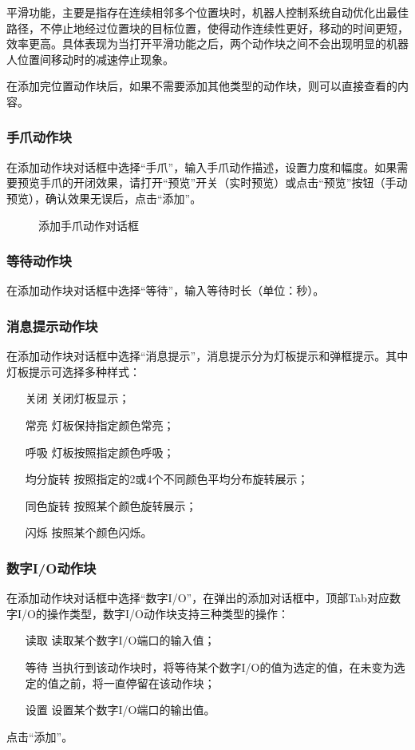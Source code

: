 平滑功能，主要是指存在连续相邻多个位置块时，机器人控制系统自动优化出最佳路径，不停止地经过位置块的目标位置，使得动作连续性更好，移动的时间更短，效率更高。具体表现为当打开平滑功能之后，两个动作块之间不会出现明显的机器人位置间移动时的减速停止现象。

在添加完位置动作块后，如果不需要添加其他类型的动作块，则可以直接查看的内容。

\subsubsection{手爪动作块}
在添加动作块对话框中选择“手爪”，输入手爪动作描述，设置力度和幅度。如果需要预览手爪的开闭效果，请打开“预览”开关（实时预览）或点击“预览”按钮（手动预览），确认效果无误后，点击“添加”。

\begin{figure}[ht]
	\centering
	\color{red}{缺图}
	\caption{添加手爪动作对话框}
	\label{fig:添加手爪动作对话框}
\end{figure}

\subsubsection{等待动作块}
在添加动作块对话框中选择“等待”，输入等待时长（单位：秒）。
\subsubsection{消息提示动作块}
在添加动作块对话框中选择“消息提示”，消息提示分为灯板提示和弹框提示。其中灯板提示可选择多种样式：
\begin{itemize}[font=\bfseries]
\item[关闭] 关闭灯板显示；
\item[常亮] 灯板保持指定颜色常亮；
\item[呼吸] 灯板按照指定颜色呼吸；
\item[均分旋转] 按照指定的2或4个不同颜色平均分布旋转展示；
\item[同色旋转] 按照某个颜色旋转展示；
\item[闪烁] 按照某个颜色闪烁。
\end{itemize}
\subsubsection{数字I/O动作块}
在添加动作块对话框中选择“数字I/O”，在弹出的添加对话框中，顶部Tab对应数字I/O的操作类型，数字I/O动作块支持三种类型的操作：
\begin{itemize}[font=\bfseries]
\item[读取] 读取某个数字I/O端口的输入值；
\item[等待] 当执行到该动作块时，将等待某个数字I/O的值为选定的值，在未变为选定的值之前，将一直停留在该动作块；
\item[设置] 设置某个数字I/O端口的输出值。
\end{itemize}
点击“添加”。

